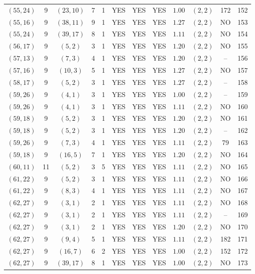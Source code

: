 \begin{longtable}{|c|c|c|c|c|c|c|c|c|c|c|c|}
$(55,24)$ & 9 & $(23,10)$ & 7 & 1 & YES & YES & YES & $1.00$ & $(2,2)$ & 172 & 152\\
$(55,16)$ & 9 & $(38,11)$ & 9 & 1 & YES & YES & YES & $1.27$ & $(2,2)$ & NO & 153\\
$(55,24)$ & 9 & $(39,17)$ & 8 & 1 & YES & YES & YES & $1.11$ & $(2,2)$ & NO & 154\\
$(56,17)$ & 9 & $(5,2)$ & 3 & 1 & YES & YES & YES & $1.20$ & $(2,2)$ & NO & 155\\
$(57,13)$ & 9 & $(7,3)$ & 4 & 1 & YES & YES & YES & $1.20$ & $(2,2)$ & -- & 156\\
$(57,16)$ & 9 & $(10,3)$ & 5 & 1 & YES & YES & YES & $1.27$ & $(2,2)$ & NO & 157\\
$(58,17)$ & 9 & $(5,2)$ & 3 & 1 & YES & YES & YES & $1.27$ & $(2,2)$ & -- & 158\\
$(59,26)$ & 9 & $(4,1)$ & 3 & 1 & YES & YES & YES & $1.00$ & $(2,2)$ & -- & 159\\
$(59,26)$ & 9 & $(4,1)$ & 3 & 1 & YES & YES & YES & $1.11$ & $(2,2)$ & NO & 160\\
$(59,18)$ & 9 & $(5,2)$ & 3 & 1 & YES & YES & YES & $1.20$ & $(2,2)$ & NO & 161\\
$(59,18)$ & 9 & $(5,2)$ & 3 & 1 & YES & YES & YES & $1.20$ & $(2,2)$ & -- & 162\\
$(59,26)$ & 9 & $(7,3)$ & 4 & 1 & YES & YES & YES & $1.11$ & $(2,2)$ & 79 & 163\\
$(59,18)$ & 9 & $(16,5)$ & 7 & 1 & YES & YES & YES & $1.20$ & $(2,2)$ & NO & 164\\
$(60,11)$ & 11 & $(5,2)$ & 3 & 5 & YES & YES & YES & $1.11$ & $(2,2)$ & NO & 165\\
$(61,22)$ & 9 & $(5,2)$ & 3 & 1 & YES & YES & YES & $1.11$ & $(2,2)$ & NO & 166\\
$(61,22)$ & 9 & $(8,3)$ & 4 & 1 & YES & YES & YES & $1.11$ & $(2,2)$ & NO & 167\\
$(62,27)$ & 9 & $(3,1)$ & 2 & 1 & YES & YES & YES & $1.11$ & $(2,2)$ & NO & 168\\
$(62,27)$ & 9 & $(3,1)$ & 2 & 1 & YES & YES & YES & $1.11$ & $(2,2)$ & -- & 169\\
$(62,27)$ & 9 & $(3,1)$ & 2 & 1 & YES & YES & YES & $1.20$ & $(2,2)$ & NO & 170\\
$(62,27)$ & 9 & $(9,4)$ & 5 & 1 & YES & YES & YES & $1.11$ & $(2,2)$ & 182 & 171\\
$(62,27)$ & 9 & $(16,7)$ & 6 & 2 & YES & YES & YES & $1.00$ & $(2,2)$ & 152 & 172\\
$(62,27)$ & 9 & $(39,17)$ & 8 & 1 & YES & YES & YES & $1.00$ & $(2,2)$ & NO & 173\\

\end{longtable}

